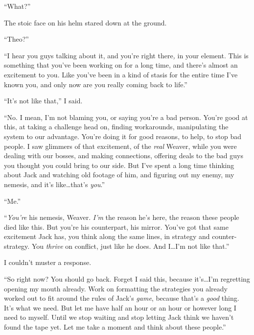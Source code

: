 ``What?''



The stoic face on his helm stared down at the ground.



``Theo?''



``I hear you guys talking about it, and you're right there\emph{, }in your element.  This is something that you've been working on for a long time, and there's almost an excitement to you.  Like you've been in a kind of stasis for the entire time I've known you, and only now are you really coming back to life.''



``It's not like that,'' I said.



``No.  I mean, I'm not blaming you, or saying you're a bad person.  You're good at this, at taking a challenge head on, finding workarounds, manipulating the system to our advantage.  You're doing it for good reasons, to help, to stop bad people.  I saw glimmers of that excitement, of the \emph{real} Weaver, while you were dealing with our bosses, and making connections, offering deals to the bad guys you thought you could bring to our side.  But I've spent a long time thinking about Jack and watching old footage of him, and figuring out my enemy, my nemesis, and it's like\ldots that's \emph{you}.''



``Me.''



``\emph{You're} his nemesis, Weaver.  \emph{I'm} the reason he's here, the reason these people died like this.  But you're his counterpart, his mirror.  You've got that same excitement Jack has, you think along the same lines, in strategy and counter-strategy.  You \emph{thrive} on conflict, just like he does.  And I\ldots I'm not like that.''



I couldn't muster a response.



``So right now?  You should go back.  Forget I said this, because it's\ldots I'm regretting opening my mouth already.  Work on formatting the strategies you already worked out to fit around the rules of Jack's \emph{game}, because that's a \emph{good} thing.  It's what we need.  But let me have half an hour or an hour or however long I need to myself.  Until we stop waiting and stop letting Jack think we haven't found the tape yet.  Let me take a moment and think about these people.''



